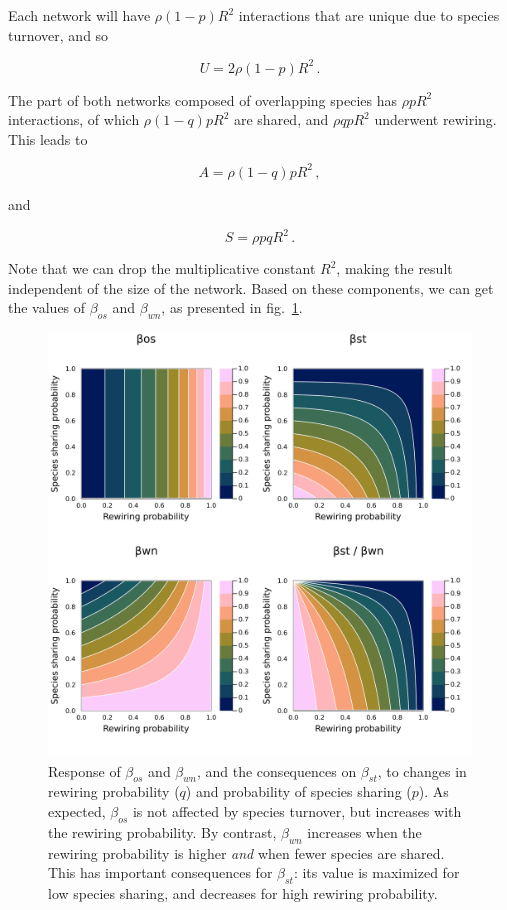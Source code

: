 \documentclass[10pt,oneside]{article}
\makeatletter
\def\maxwidth{\ifdim\Gin@nat@width>\linewidth\linewidth
\else\Gin@nat@width\fi}
\let\Oldincludegraphics\includegraphics
\renewcommand{\includegraphics}[1]{\Oldincludegraphics[width=\maxwidth]{#1}}
\makeatother
\begin{document}
Each network will have \(\rho(1-p)R^2\) interactions that are unique due
to species turnover, and so

\[U = 2\rho(1-p)R^2\,.\]

The part of both networks composed of overlapping species has
\(\rho pR^2\) interactions, of which \(\rho (1-q) p R^2\) are shared,
and \(\rho qp R^2\) underwent rewiring. This leads to

\[A = \rho (1-q) p R^2\,,\]

and

\[S = \rho pq R^2\,.\]

Note that we can drop the multiplicative constant \(R^2\), making the
result independent of the size of the network. Based on these
components, we can get the values of \(\beta_{os}\) and \(\beta_{wn}\),
as presented in fig.~\ref{fig:numexp2}.

\begin{figure}
\hypertarget{fig:numexp2}{%
\centering
\includegraphics{figures/numexp2.png}
\caption{Response of \(\beta_{os}\) and \(\beta_{wn}\), and the
consequences on \(\beta_{st}\), to changes in rewiring probability
(\(q\)) and probability of species sharing (\(p\)). As expected,
\(\beta_{os}\) is not affected by species turnover, but increases with
the rewiring probability. By contrast, \(\beta_{wn}\) increases when the
rewiring probability is higher \emph{and} when fewer species are shared.
This has important consequences for \(\beta_{st}\): its value is
maximized for low species sharing, and decreases for high rewiring
probability.}\label{fig:numexp2}
}
\end{figure}
\end{document}
